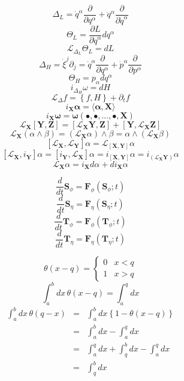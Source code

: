 \documentclass[10pt]{article}
\begin{document}
\newpage
\null
\[
  \Delta_L = {\dot q}^{\alpha} \frac{\partial}{\partial q^{\alpha}} + {\ddot q}^{\alpha} \frac{\partial}{\partial {\dot q}^{\alpha}}
\]
\[
  \Theta_L = \frac{\partial L}{\partial {\dot q}^{\alpha}} d q^{\alpha}
\]
\[
  {\mathcal L}_{\Delta_L} \Theta_L = d L
\]
\[
  \Delta_H = {\dot \xi}^{j} \partial_j = {\dot q}^{\alpha} \frac{\partial}{\partial {q^{\alpha}}} + {\dot p}^{\alpha} \frac{\partial}{\partial {p^{\alpha}}}
\]
\[
  \Theta_H = p_{\alpha} d q^{\alpha}
\]
\[
  i_{\Delta_H} \omega = d H
\]
\[
 {\mathcal L}_{\Delta} f = \left\{ f , H \right\} + \partial_t f
\]
\[
  i_{\mathbf X} {\mathbf \alpha} = \langle {\mathbf \alpha} , {\mathbf X} \rangle
\]
\[
  i_{\mathbf X} {\mathbf \omega} = {\mathbf \omega} \left( \bullet , \bullet, \dots, \bullet, {\mathbf X} \right)
\]
\[
   {\mathcal L}_{\mathbf X} \left[ {\mathbf Y}, {\mathbf Z} \right] 
 = \left[ {\mathcal L}_{\mathbf X} {\mathbf Y}, {\mathbf Z} \right] + \left[ {\mathbf Y}, {\mathcal L}_{\mathbf X} {\mathbf Z} \right]
\]
\[
  {\mathcal L}_{\mathbf X} \left( \alpha \wedge \beta \right) 
 = \left( {\mathcal L}_{\mathbf X} \alpha \right) \wedge \beta
 = \alpha \wedge \left( {\mathcal L}_{\mathbf X} \beta \right) 
\]
\[
  \left[ {\mathcal L}_{\mathbf X}, {\mathcal L}_{\mathbf Y} \right] \alpha = {\mathcal L}_{\left[ {\mathbf X}, {\mathbf Y} \right] } \alpha
\]
\[
    \left[ {\mathcal L}_{\mathbf X} , i_{\mathbf Y} \right] \alpha 
  = \left[ i_{\mathbf Y}, {\mathcal L}_{\mathbf X} \right] \alpha 
  = i_{\left[ {\mathbf X}, {\mathbf Y} \right] } \alpha
  = i_{ \left( {\mathcal L}_{\mathbf X} {\mathbf Y} \right) } \alpha
\]
\[
 {\mathcal L}_{\mathbf X} \alpha = i_{\mathbf X} d \alpha + d i_{\mathbf X} \alpha
\]

\[
  \frac{d}{d t} {\mathbf S}_\phi = {\mathbf F}_\phi \left( {\mathbf S}_{\phi} ; t \right)
\]
\[
  \frac{d}{d t} {\mathbf S}_\eta = {\mathbf F}_\eta \left( {\mathbf S}_\eta ; t \right)
\]
\[
  \frac{d}{d t} {\mathbf T}_\phi = {\mathbf F}_\phi \left( {\mathbf T}_\phi ; t \right)
\]
\[
  \frac{d}{d t} {\mathbf T}_\eta = {\mathbf F}_\eta \left( {\mathbf T}_\eta ; t \right)
\]

\[
  \theta(x - q) = \left\{ \begin{array}{ll} 0 & x < q \\ 1 & x > q \end{array} \right.
\]
\[
 \int_{a}^{b} dx \, \theta(x-q) = \int_{a}^{q} d x
\]
\begin{eqnarray*}
 \int_{a}^{b} dx \, \theta(q - x)	& = & \int_{a}^{b} dx \left\{1 - \theta(x-q) \right\} \\
								& = & \int_{a}^{b} dx - \int_{a}^{q} dx \\
								& = & \int_{a}^{q} dx + \int_{q}^{b} dx - \int_{a}^{q} dx\\
								& = & \int_{q}^{b} dx
\end{eqnarray*}
\end{document}
